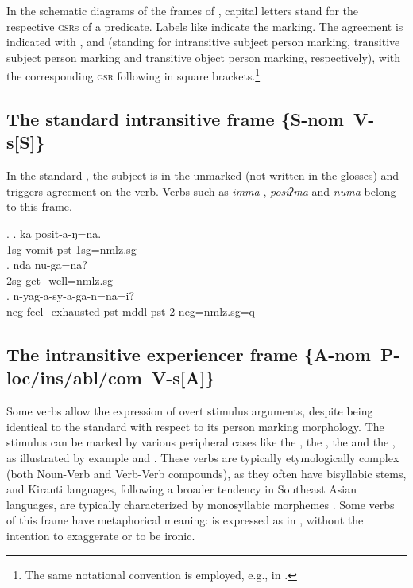 In the schematic diagrams of the frames of ,  capital letters stand for the respective \textsc{gsr}s of a predicate. Labels like  indicate the  marking. The agreement is indicated with ,  and  (standing for intransitive subject person marking, transitive subject person marking and transitive object person marking, respectively), with the corresponding \textsc{gsr} following in square brackets.\footnote{The same notational convention is employed, e.g., in \citet{Schikowski2014_Flexible}.} 
 

\subsection[The standard intransitive frame]{The standard intransitive frame %
\mbox{{\bf \{S-{\sc nom} V-s[S]\}}}}
\label{stand-itr}

\largerpage
\noindent 
In the standard , the subject is in the unmarked   (not written in the glosses) and triggers agreement on the verb. Verbs such as \emph{imma} ,  \emph{posiʔma}  and \emph{numa}  belong to this frame.

\ex. \ag. ka posit-a-ŋ=na.\\
		 {\sc 1sg} vomit-{\sc pst-1sg=nmlz.sg}	\\
 	\bg. nda nu-ga=na?\\
	{\sc 2sg}  get\_well{=nmlz.sg}	\\
	\bg. n-yag-a-sy-a-ga-n=na=i?\\ 
{\sc neg}-feel\_exhausted{\sc -pst-mddl-pst-2-neg=nmlz.sg=q}\\

\subsection[The intransitive experiencer frame]{The intransitive experiencer frame 	 %
\mbox{\{A-{\sc nom} P-{\sc loc/ins/abl/com} V-s[A]\}}}
\label{itr-exp}


\noindent 
Some  verbs allow the expression of overt stimulus arguments, despite being identical to  the standard  with respect to its person marking morphology. The stimulus can be marked by various peripheral cases like the , the , the  and the , as illustrated by example \Next[a] and \Next[b].  These  verbs are typically etymologically complex (both Noun-Verb and Verb-Verb compounds), as they often have bisyllabic stems, and Kiranti languages, following a broader tendency in Southeast Asian languages, are typically characterized by monosyllabic morphemes \citep{Matisoff1990_Bulging}. Some verbs of this frame have metaphorical meaning:  is expressed as in \Next[c], without the intention to exaggerate or to be ironic. 

